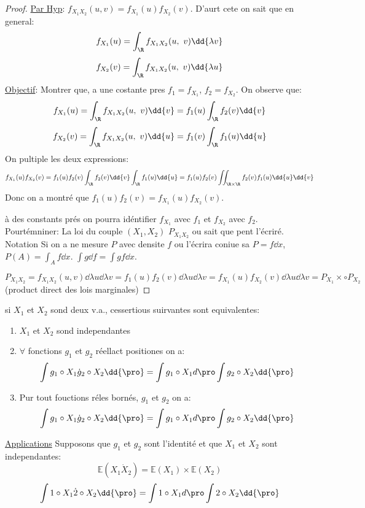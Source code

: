 \begin{proof}
	\underline{Par Hyp}: $f_{X_1X_2}(u, v)=f_{X_1}(u) f_{X_2}(v)$. D'aurt cete on sait que en general:
	$$f_{X_1}(u)=\int_{\R}f_{X_1X_2}(u,\ v)\dd{\lambda v}$$
	$$f_{X_2}(v)=\int_{\R}f_{X_1X_2}(u,\ v)\dd{\lambda u}$$
	\underline{Objectif}: Montrer que, a une costante pres $f_1=f_{X_1}$, $f_2=f_{X_2}$. On observe que:
	$$f_{X_1}(u)=\int_{\R}f_{X_1X_2}(u,\ v)\dd{v}=f_1(u)\int_\R f_2(v)\dd{v}$$
	$$f_{X_2}(v)=\int_{\R}f_{X_1X_2}(u,\ v)\dd{u}=f_1(v)\int_\R f_1(u)\dd{u}$$
	On pultiple les deux expressions:
	$$f_{X_1}(u)f_{X_2}(v)=f_1(u)f_2(v)\int_\R f_2(v)\dd{v}\int_\R f_1(u)\dd{u}=f_1(u)f_2(v)\iint_{\R\times\R} f_2(v) f_1(u)\dd{u}\dd{v}$$
	Donc on a montré que $f_1(u)f_2(v)=f_{X_1}(u)f_{X_2}(v)$.
	\begin{remark}
		à des constants prés on pourra idéntifier $f_{X_1}$ avec $f_1$ et $f_{X_2}$ avec $f_2$. Pourtémniner: La loi du couple $(X_1, X_2)$ $P_{X_1X_2}$ ou sait que pent l'écriré. Notation Si on a ne mesure $P$ avec densite $f$ ou l'écrira coniue sa $P=f\dd{x}$, $P(A)=\int_A f\dd{x}$. $\int g\dd{f}=\int g f\dd{x}$.
	\end{remark}
		$$P_{X_1X_2}=f_{X_1X_2}(u, v)\dd{\lambda u}\dd{\lambda v}=f_1(u)f_2(v)\dd{\lambda u}\dd{\lambda v}=f_{X_1}(u)f_{X_2}(v)\dd{\lambda u}\dd{\lambda v}=P_{X_1}\times\circ P_{X_2}$$(product direct des lois marginales)

\end{proof}

\begin{proposition}
	si $X_1$ et $X_2$ sond deux v.a., cessertious suirvantes sont equivalentes:
	\begin{enumerate}
		\item $X_1$ et $X_2$ sond independantes
		\item $\forall$ fonctions $g_1$ et $g_2$ réellact positiones on a:
			$$\int g_1\circ X_1 \dot g_2\circ X_2\dd{\pro}= \int g_1\circ X_1 d{\pro}\int g_2\circ X_2\dd{\pro}$$
		\item Pur tout fouctions réles bornés, $g_1$ et $g_2$ on a:
			$$\int g_1\circ X_1 \dot g_2\circ X_2\dd{\pro}= \int g_1\circ X_1 d{\pro}\int g_2\circ X_2\dd{\pro}$$
	\end{enumerate}
\end{proposition}

\underline{Applications} Supposons que $g_1$ et $g_2$ sont l'identité et que $X_1$ et $X_2$ sont independantes:
	$$\mathbb{E}(X_1\dot X_2)=\mathbb{E}(X_1)\times\mathbb{E}(X_2)$$
	$$\int 1\circ X_1 \dot 2\circ X_2\dd{\pro}= \int 1\circ X_1 d{\pro}\int 2\circ X_2\dd{\pro}$$
	
